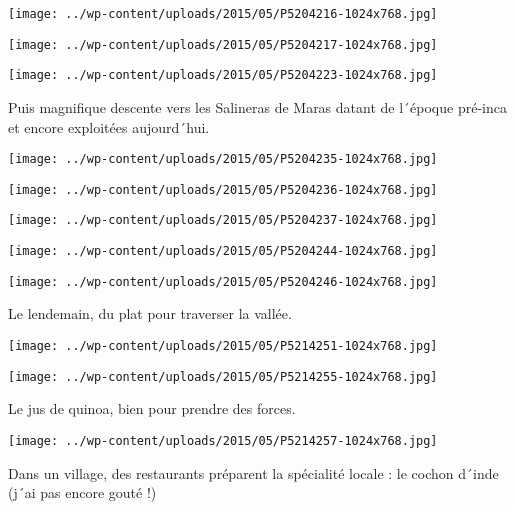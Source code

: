 \centerline{\texttt{[image: ../wp-content/uploads/2015/05/P5204216-1024x768.jpg]} } 
 \newline
 \newline
\centerline{\texttt{[image: ../wp-content/uploads/2015/05/P5204217-1024x768.jpg]} } 
 \newline
 \newline
\centerline{\texttt{[image: ../wp-content/uploads/2015/05/P5204223-1024x768.jpg]} } 
 \newline
 Puis magnifique descente vers les Salineras de Maras datant de l´époque pré-inca et encore exploitées aujourd´hui. \newline
 \newline
\centerline{\texttt{[image: ../wp-content/uploads/2015/05/P5204235-1024x768.jpg]} } 
 \newline
 \newline
\centerline{\texttt{[image: ../wp-content/uploads/2015/05/P5204236-1024x768.jpg]} } 
 \newline
 \newline
\centerline{\texttt{[image: ../wp-content/uploads/2015/05/P5204237-1024x768.jpg]} } 
 \newline
 \newline
\centerline{\texttt{[image: ../wp-content/uploads/2015/05/P5204244-1024x768.jpg]} } 
 \newline
 \newline
\centerline{\texttt{[image: ../wp-content/uploads/2015/05/P5204246-1024x768.jpg]} } 
 \newline
 Le lendemain, du plat pour traverser la vallée. \newline
 \newline
\centerline{\texttt{[image: ../wp-content/uploads/2015/05/P5214251-1024x768.jpg]} } 
 \newline
 \newline
\centerline{\texttt{[image: ../wp-content/uploads/2015/05/P5214255-1024x768.jpg]} } 
 \newline
 Le jus de quinoa, bien pour prendre des forces. \newline
 \newline
\centerline{\texttt{[image: ../wp-content/uploads/2015/05/P5214257-1024x768.jpg]} } 
 \newline
 Dans un village, des restaurants préparent la spécialité locale : le cochon d´inde (j´ai pas encore gouté !) \newline
